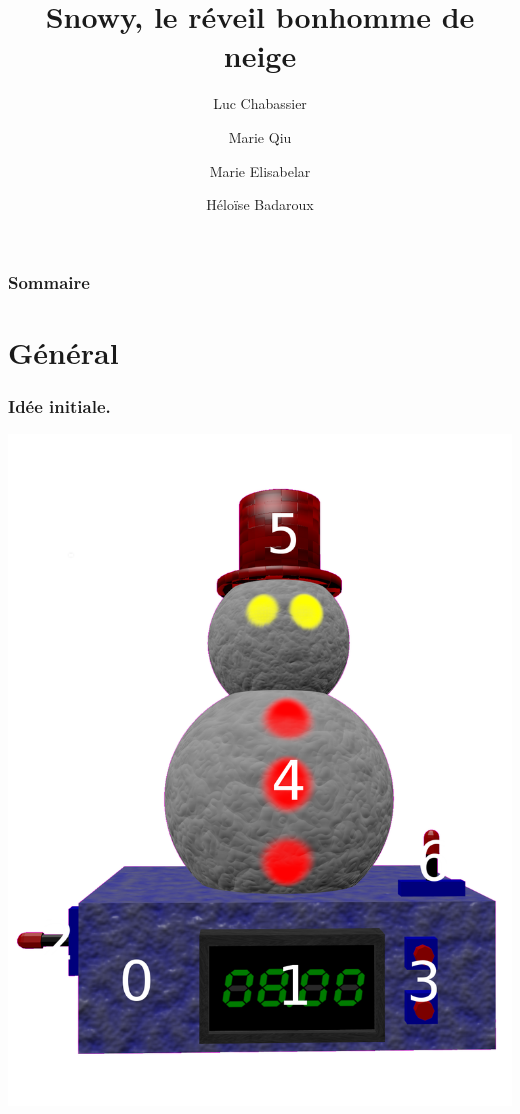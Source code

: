 \documentclass{beamer}
\title{Snowy, le réveil bonhomme de neige}
\author{Luc Chabassier \and Marie Qiu \and Marie Elisabelar \and Héloïse Badaroux}
\institute{Lycée Pierre de Fermat}
\begin{document}
\begin{frame}[t,plain]
	\titlepage
\end{frame}

\begin{frame}[t]
	\frametitle{Sommaire}
	\tableofcontents
\end{frame}

\section{Général}

\begin{frame}[t]
	\frametitle{Idée initiale.}
	\begin{center}
		\includegraphics[scale=0.1]{rc/example_num.png}
	\end{center}
\end{frame}
\end{document}
